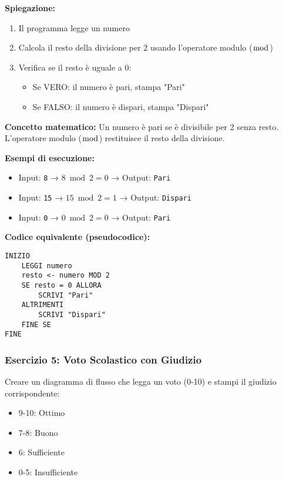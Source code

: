 \documentclass[a4paper,16pt]{article}
\begin{document}
\textbf{Spiegazione:}
\begin{enumerate}
    \item Il programma legge un numero
    \item Calcola il resto della divisione per 2 usando l'operatore modulo ($\bmod$)
    \item Verifica se il resto è uguale a 0:
    \begin{itemize}
        \item Se VERO: il numero è pari, stampa "Pari"
        \item Se FALSO: il numero è dispari, stampa "Dispari"
    \end{itemize}
\end{enumerate}

\textbf{Concetto matematico:} Un numero è pari se è divisibile per 2 senza resto. L'operatore modulo ($\bmod$) restituisce il resto della divisione.

\textbf{Esempi di esecuzione:}
\begin{itemize}
    \item Input: \texttt{8} → $8 \bmod 2 = 0$ → Output: \texttt{Pari}
    \item Input: \texttt{15} → $15 \bmod 2 = 1$ → Output: \texttt{Dispari}
    \item Input: \texttt{0} → $0 \bmod 2 = 0$ → Output: \texttt{Pari}
\end{itemize}

\textbf{Codice equivalente (pseudocodice):}
\begin{lstlisting}
INIZIO
    LEGGI numero
    resto <- numero MOD 2
    SE resto = 0 ALLORA
        SCRIVI "Pari"
    ALTRIMENTI
        SCRIVI "Dispari"
    FINE SE
FINE
\end{lstlisting}

\newpage
\subsubsection{Esercizio 5: Voto Scolastico con Giudizio}

\begin{tcolorbox}[colback=blue!5!white,colframe=blue!75!black,title=Traccia]
Creare un diagramma di flusso che legga un voto (0-10) e stampi il giudizio corrispondente:
\begin{itemize}
    \item 9-10: Ottimo
    \item 7-8: Buono
    \item 6: Sufficiente
    \item 0-5: Insufficiente
\end{itemize}
\end{tcolorbox}
\end{document}
